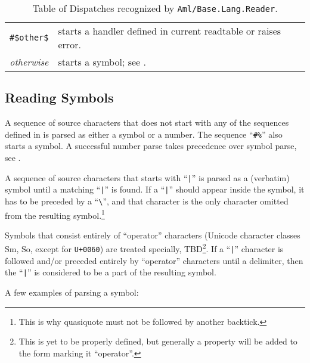 \begin{table}
\begin{longtable}{ r l }
  \lstinline!#$other$! & starts a handler defined in current readtable or raises error. \\
  
  {\em otherwise} & starts a symbol; see \nameref{subsec:aml-base-lang-reader-symbols}. \\
\end{longtable}
\caption{\label{tab:aml-base-lang-reader-dispatch}Table of Dispatches recognized by \lstinline!Aml/Base.Lang.Reader!.}
\end{table}





\newpage

\subsection{Reading Symbols}
\label{subsec:aml-base-lang-reader-symbols}


A sequence of source characters that does not start with any of the sequences defined in  is parsed as either a symbol or a number. The sequence ``\lstinline!#%!'' also starts a symbol. A successful number parse takes precedence over symbol parse, see . 

A sequence of source characters that starts with ``\lstinline!|!'' is parsed as a (verbatim) symbol until a matching ``\lstinline!|!'' is found. If a ``\lstinline!|!'' should appear inside the symbol, it has to be preceded by a ``\lstinline!\!'', and that character is the only character omitted from the resulting symbol.\footnote{This is why quasiquote must not be followed by another backtick.}

Symbols that consist entirely of ``operator'' characters (Unicode character classes Sm, So, except for \lstinline!U+0060!) are treated specially, TBD\footnote{This is yet to be properly defined, but generally a property will be added to the form marking it ``operator''.}. If a ``\lstinline!|!'' character is followed and/or preceded entirely by ``operator'' characters until a delimiter, then the ``\lstinline!|!'' is considered to be a part of the resulting symbol.


\example A few examples of parsing a symbol:


